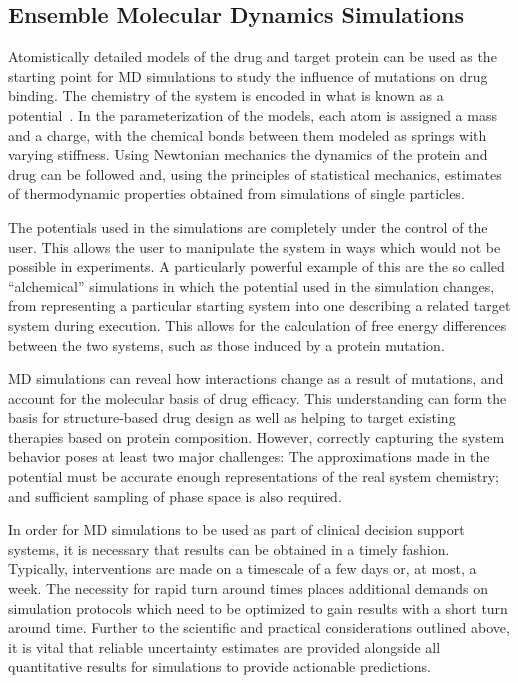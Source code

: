 \documentclass{bmcart}
\begin{document}
\subsection*{Ensemble Molecular Dynamics Simulations}

Atomistically detailed models of the drug and target protein can be used as the
starting point for MD simulations to
study the influence of mutations on drug binding. The chemistry of the system
is encoded in what is known as a potential~\cite{Karplus2002}. In the
parameterization of the models, each atom is assigned a mass and a charge,
with the chemical bonds between them modeled as springs with varying
stiffness. Using Newtonian mechanics the dynamics of the protein and drug can
be followed and, using the principles of statistical mechanics, estimates of
thermodynamic properties obtained from simulations of single particles.

The potentials used in the simulations are completely under the control of
the user. This allows the user to manipulate the system in ways which would
not be possible in experiments. A particularly powerful example of this are
the so called ``alchemical'' simulations in which the potential used in the
simulation changes, from representing a particular starting system into one 
describing a related target system during execution. This allows for the 
calculation of free energy differences between the two systems, such as those 
induced by a protein mutation.

MD simulations can reveal how interactions change as a result of mutations,
and account for the molecular basis of drug efficacy. This understanding can
form the basis for structure-based drug design as well as helping to target
existing therapies based on protein composition. However, correctly capturing
the system behavior poses at least two major challenges: The approximations
made in the potential must be accurate enough representations of the real
system chemistry; and sufficient sampling of phase space is also required.

In order for MD simulations to be used as part of clinical decision support
systems, it is necessary that results can be obtained in a timely fashion.
Typically, interventions are made on a timescale of a few days or, at most, a
week. The necessity for rapid turn around times places additional demands on
simulation protocols which need to be optimized to gain results with a short
turn around time. Further to the scientific and practical considerations
outlined above, it is vital that reliable uncertainty estimates are
provided alongside all quantitative results for simulations to provide
actionable predictions.
\end{document}

